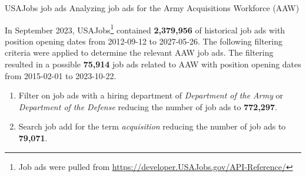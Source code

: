 \documentclass{beamer}
\begin{document}
\begin{frame}{USAJobs job ads}
  Analyzing job ads for the Army Acquisitions Workforce (AAW)

  \vspace{.25cm}

  In September 2023, USAJobs\footnote{Job ads were pulled from \href{https://developer.USAJobs.gov/API-Reference/}{https://developer.USAJobs.gov/API-Reference/}} contained \textbf{2,379,956 }of historical job ads with position opening dates from 2012-09-12 to 2027-05-26. The following filtering criteria were applied to determine the relevant AAW job ads. The filtering resulted in a possible \textbf{75,914} job ads related to AAW with position opening dates from 2015-02-01 to 2023-10-22.

  \begin{enumerate}
    \item Filter on job ads with a hiring department of \textit{Department of the Army} or \textit{Department of the Defense} reducing the number of job ads to \textbf{772,297}.
    \item Search job add for the term \textit{acquisition} reducing the number of job ads to \textbf{79,071}.
  \end{enumerate}

\end{frame}

\end{document}
